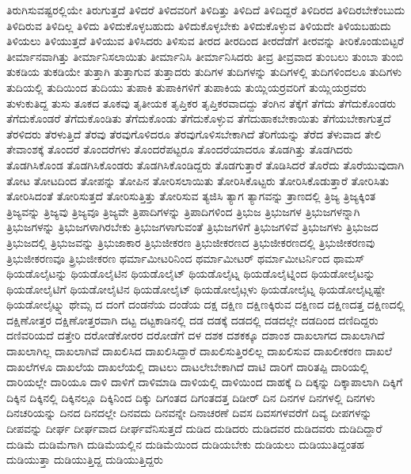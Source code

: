 {ತಿರುಗಿಸುವಷ್ಟರಲ್ಲಿಯೇ
ತಿರುಗುತ್ತದೆ
ತಿಳಿದರೆ
ತಿಳಿದವರಿಗೆ
ತಿಳಿದಿತ್ತು
ತಿಳಿದಿದೆ
ತಿಳಿದಿದ್ದರೆ
ತಿಳಿದಿರದ
ತಿಳಿದಿರಬೇಕೆಂಬುದು
ತಿಳಿದಿರುವ
ತಿಳಿದಿಲ್ಲ
ತಿಳಿದು
ತಿಳಿದುಕೊಳ್ಳಬಹುದು
ತಿಳಿದುಕೊಳ್ಳಬೇಕು
ತಿಳಿದುಕೊಳ್ಳುವ
ತಿಳಿಯದೇ
ತಿಳಿಯಬಹುದು
ತಿಳಿಯಲು
ತಿಳಿಯುತ್ತದೆ
ತಿಳಿಯುವ
ತಿಳಿಸಿದರು
ತಿಳಿಸುವ
ತೀರದ
ತೀರದಿಂದ
ತೀರದೆಡೆಗೆ
ತೀರವನ್ನು
ತೀರಿಕೊಂಡುಬಿಟ್ಟರೆ
ತೀರ್ಮಾನವಾಗಿತ್ತು
ತೀರ್ಮಾನಿಸಲಾಯಿತು
ತೀರ್ಮಾನಿಸಿ
ತೀರ್ಮಾನಿಸಿದರು
ತೀವ್ರ
ತೀವ್ರವಾದ
ತುಂಬಲು
ತುಂಬಾ
ತುಂಬಿ
ತುಕಡಿಯ
ತುಕಡಿಯೇ
ತುತ್ತಾಗಿ
ತುತ್ತಾಗುವ
ತುತ್ತಾದರು
ತುದಿಗಳ
ತುದಿಗಳನ್ನು
ತುದಿಗಳಲ್ಲಿ
ತುದಿಗಳಿಂದಲೂ
ತುದಿಗಳು
ತುದಿಯಲ್ಲಿ
ತುದಿಯಿಂದ
ತುದಿಯು
ತುಪಾಕಿ
ತುಪಾಕಿಗಳಿಗೆ
ತುಪಾಕಿಯ
ತುಯ್ಲಿಯರ್ರವರಿಗೆ
ತುಯ್ಲಿಯರ್ರವರು
ತುಳುಕುತಿದ್ದ
ತುಸು
ತೂಕದ
ತೂಕವು
ತೃತೀಯಕ
ತೃಪ್ತಿಕರ
ತೃಪ್ತಿಕರವಾದದ್ದು
ತೆಂಗಿನ
ತೆಕ್ಕೆಗೆ
ತೆಗೆದು
ತೆಗೆದುಕೊಂಡರು
ತೆಗೆದುಕೊಂಡರೆ
ತೆಗೆದುಕೊಂಡಿತು
ತೆಗೆದುಕೊಂಡು
ತೆಗೆದುಕೊಳ್ಳುವ
ತೆಗೆದುಹಾಕಬೇಕಾಯಿತು
ತೆಗೆಯಬೇಕಾಗುತ್ತದೆ
ತೆರಳಿದರು
ತೆರಳುತ್ತಿದೆ
ತೆರವು
ತೆರವುಗೊಳಿದರೂ
ತೆರವುಗೊಳಿಸಬೇಕಾಗಿದೆ
ತೆರಿಗೆಯನ್ನು
ತೆರೆದ
ತೆಳುವಾದ
ತೇಲಿ
ತೇವಾಂಶಕ್ಕೆ
ತೊಂದರೆ
ತೊಂದರೆಗಳು
ತೊಂದರೆಪಟ್ಟರೂ
ತೊಂದರೆಯಾದರೂ
ತೊಡಗಿತ್ತು
ತೊಡಗಿದರು
ತೊಡಗಿಸಿಕೊಂಡ
ತೊಡಗಿಸಿಕೊಂಡರು
ತೊಡಗಿಸಿಕೊಂಡಿದ್ದರು
ತೊಡಗುತ್ತಾರೆ
ತೊಡಿಸಿದರೆ
ತೊರೆದು
ತೊರೆಯುವುದಾಗಿ
ತೋಟ
ತೋಟದಿಂದ
ತೋಪನ್ನು
ತೋಪಿನ
ತೋರಿಸಲಾಯಿತು
ತೋರಿಸಿಕೊಟ್ಟರು
ತೋರಿಸಿಕೊಡುತ್ತಾರೆ
ತೋರಿಸಿತು
ತೋರಿಸಿದಂತೆ
ತೋರಿಸುತ್ತದೆ
ತೋರಿಸುತ್ತಿತ್ತು
ತೋರಿಸುವ
ತ್ಯಜಿಸಿ
ತ್ಯಾಗ
ತ್ಯಾಗವನ್ನು
ತ್ರಾಣದಲ್ಲಿ
ತ್ರಿಜ್ಯ
ತ್ರಿಜ್ಯಕ್ಕಿಂತ
ತ್ರಿಜ್ಯವನ್ನು
ತ್ರಿಜ್ಯವು
ತ್ರಿಜ್ಯವೂ
ತ್ರಿಜ್ಯವೇ
ತ್ರಿಪಾದಿಗಳನ್ನು
ತ್ರಿಪಾದಿಗಳಿಂದ
ತ್ರಿಭುಜ
ತ್ರಿಭುಜಗಳ
ತ್ರಿಭುಜಗಳನ್ನಾಗಿ
ತ್ರಿಭುಜಗಳನ್ನು
ತ್ರಿಭುಜಗಳಾಗಿರಬೇಕು
ತ್ರಿಭುಜಗಳಾಗುವಂತೆ
ತ್ರಿಭುಜಗಳಿಗೆ
ತ್ರಿಭುಜಗಳಿವೆ
ತ್ರಿಭುಜಗಳು
ತ್ರಿಭುಜದ
ತ್ರಿಭುಜದಲ್ಲಿ
ತ್ರಿಭುಜವನ್ನು
ತ್ರಿಭುಜಾಕಾರ
ತ್ರಿಭುಜೀಕರಣ
ತ್ರಿಭುಜೀಕರಣದ
ತ್ರಿಭುಜೀಕರಣದಲ್ಲಿ
ತ್ರಿಭುಜೀಕರಣವು
ತ್ರಿಭುಜೀಕರಣವೂ
ತ್ರ್ರಿಭುಜೀಕರಣ
ಥರ್ಮಾಮೀಟರಿನಿಂದ
ಥರ್ಮಾಮೀಟರ್
ಥರ್ಮಾಮೀಟರ್ನಿಂದ
ಥಾಮಸ್
ಥಿಯಡೊಲೈಟನ್ನು
ಥಿಯಡೊಲೈಟಿನ
ಥಿಯಡೊಲೈಟ್
ಥಿಯಡೊಲೈಟ್ನ
ಥಿಯಡೊಲೈಟ್ನಿಂದ
ಥಿಯಡೋಲೈಟನ್ನು
ಥಿಯಡೋಲೈಟಿಗೆ
ಥಿಯಡೋಲೈಟಿನ
ಥಿಯಡೋಲೈಟ್
ಥಿಯಡೋಲೈಟ್ಗಳು
ಥಿಯಡೋಲೈಟ್ನ
ಥಿಯಡೋಲೈಟ್ನಷ್ಟೇ
ಥಿಯಡೋಲೈಟ್ನ್ನು
ಥೇಮ್ಸ
ದ
ದಂಗೆ
ದಂಡನೆಯ
ದಂಡೆಯ
ದಕ್ಷ
ದಕ್ಷಿಣ
ದಕ್ಷಿಣಕ್ಕಿರುವ
ದಕ್ಷಿಣದ
ದಕ್ಷಿಣದತ್ತ
ದಕ್ಷಿಣದಲ್ಲಿ
ದಕ್ಷಿಣೋತ್ತರ
ದಕ್ಷಿಣೋತ್ತರವಾಗಿ
ದಟ್ಟ
ದಟ್ಟಕಾಡಿನಲ್ಲಿ
ದಡ
ದಡಕ್ಕೆ
ದಡದಲ್ಲಿ
ದಡದಲ್ಲೇ
ದಡದಿಂದ
ದಣಿದಿದ್ದರು
ದಣಿವರಿಯದೆ
ದತ್ತೇರಿ
ದರೋಡೆಕೋರರ
ದರೋಡೆಗೆ
ದಳ
ದಶಕ
ದಶಕಕ್ಕೂ
ದಶಾಂಶ
ದಾಖಲಾಗದ
ದಾಖಲಾಗಿದೆ
ದಾಖಲಾಗಿಲ್ಲ
ದಾಖಲಾಗಿವೆ
ದಾಖಲಿಸಿದ
ದಾಖಲಿಸಿದ್ದಾರೆ
ದಾಖಲಿಸುತ್ತಿರಲಿಲ್ಲ
ದಾಖಲಿಸುವ
ದಾಖಲೀಕರಣ
ದಾಖಲೆ
ದಾಖಲೆಗಳೂ
ದಾಖಲೆಯ
ದಾಖಲೆಯಲ್ಲಿ
ದಾಟಲು
ದಾಟಲೇಬೇಕಾಗಿದೆ
ದಾಟಿ
ದಾರಿಗೆ
ದಾರಿತಪ್ಪಿ
ದಾರಿಯಲ್ಲಿ
ದಾರಿಯಲ್ಲೇ
ದಾರಿಯೂ
ದಾಳಿ
ದಾಳಿಗೆ
ದಾಳಿಮಾಡಿ
ದಾಳಿಯಲ್ಲಿ
ದಾಳಿಯಿಂದ
ದಾಹಕ್ಕೆ
ದಿ
ದಿಕ್ಕನ್ನು
ದಿಕ್ಕಾಪಾಲಾಗಿ
ದಿಕ್ಕಿಗೆ
ದಿಕ್ಕಿನ
ದಿಕ್ಕಿನಲ್ಲಿ
ದಿಕ್ಕಿನಲ್ಲೂ
ದಿಕ್ಕಿನಿಂದ
ದಿಕ್ಕು
ದಿಗಂತದ
ದಿಗಂತದತ್ತ
ದಿಡೀರ್
ದಿನ
ದಿನಗಳ
ದಿನಗಳಲ್ಲಿ
ದಿನಗಳು
ದಿನಚರಿಯನ್ನು
ದಿನದ
ದಿನದಲ್ಲೇ
ದಿನವದು
ದಿನವನ್ನೇ
ದಿನಾಚರಣೆ
ದಿವಸ
ದಿವಸಗಳವರೆಗೆ
ದಿವ್ಯ
ದೀಪಗಳನ್ನು
ದೀಪವನ್ನು
ದೀರ್ಘ
ದೀರ್ಘವಾದ
ದೀರ್ಘವೆನಿಸುತ್ತದೆ
ದುಡಿದ
ದುಡಿದರು
ದುಡಿದವರ
ದುಡಿದವರು
ದುಡಿದಿದ್ದಾರೆ
ದುಡಿಮೆ
ದುಡಿಮೆಗಾಗಿ
ದುಡಿಮೆಯಲ್ಲಿನ
ದುಡಿಮೆಯಿಂದ
ದುಡಿಯಬೇಕು
ದುಡಿಯಲು
ದುಡಿಯುತಿದ್ದಂತಹ
ದುಡಿಯುತ್ತಾ
ದುಡಿಯುತ್ತಿದ್ದ
ದುಡಿಯುತ್ತಿದ್ದರು
}
